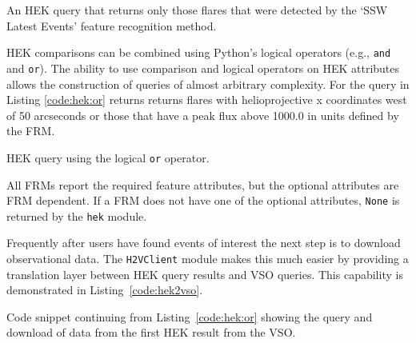 \begin{listing}[H]
\caption{An HEK query that returns only those flares that were
  detected by the `SSW Latest Events' feature recognition method.}
\label{code:hek:frm}
\end{listing}

HEK comparisons can be combined using Python's logical operators (e.g., \texttt{and}
and \texttt{or}). The ability to use comparison and logical operators on HEK attributes allows 
the construction of queries of almost arbitrary complexity.
For the query in Listing \ref{code:hek:or} returns
returns flares with helioprojective x coordinates west of 50 arcseconds or 
those that have a peak flux above 1000.0 in units defined by the FRM.

\begin{listing}[H]
\caption{HEK query using the logical \texttt{or} operator.}
\label{code:hek:or}
\end{listing}
All FRMs report the required feature attributes, but the optional attributes 
are FRM dependent.  If a FRM does not have one of the optional attributes, 
\texttt{None} is returned by the \texttt{hek} module. 
 
Frequently after users have found events of interest the next step is to 
download observational data. The \texttt{H2VClient} module makes this
much easier by providing a translation layer between HEK query results
and VSO queries. This capability is demonstrated in Listing~\ref{code:hek2vso}.
\begin{listing}[H]
\caption{Code snippet continuing from Listing~\ref{code:hek:or} showing the 
query and download of data from the first HEK result from the VSO.}
\label{code:hek2vso}
\end{listing}
